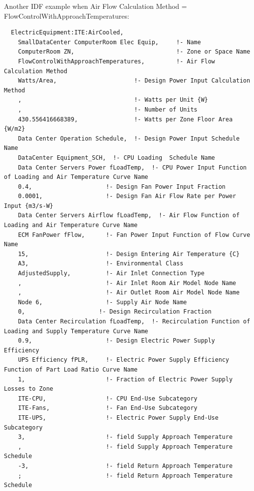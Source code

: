 Another IDF example when Air Flow Calculation Method = FlowControlWithApproachTemperatures:

\begin{lstlisting}
  ElectricEquipment:ITE:AirCooled,
    SmallDataCenter ComputerRoom Elec Equip,     !- Name
    ComputerRoom ZN,                             !- Zone or Space Name
    FlowControlWithApproachTemperatures,         !- Air Flow Calculation Method
    Watts/Area,                      !- Design Power Input Calculation Method
    ,                                !- Watts per Unit {W}
    ,                                !- Number of Units
    430.556416668389,                !- Watts per Zone Floor Area {W/m2}
    Data Center Operation Schedule,  !- Design Power Input Schedule Name
    DataCenter Equipment_SCH,  !- CPU Loading  Schedule Name
    Data Center Servers Power fLoadTemp,  !- CPU Power Input Function of Loading and Air Temperature Curve Name
    0.4,                     !- Design Fan Power Input Fraction
    0.0001,                  !- Design Fan Air Flow Rate per Power Input {m3/s-W}
    Data Center Servers Airflow fLoadTemp,  !- Air Flow Function of Loading and Air Temperature Curve Name
    ECM FanPower fFlow,      !- Fan Power Input Function of Flow Curve Name
    15,                      !- Design Entering Air Temperature {C}
    A3,                      !- Environmental Class
    AdjustedSupply,          !- Air Inlet Connection Type
    ,                        !- Air Inlet Room Air Model Node Name
    ,                        !- Air Outlet Room Air Model Node Name
    Node 6, 			     !- Supply Air Node Name
    0,                     !- Design Recirculation Fraction
    Data Center Recirculation fLoadTemp,  !- Recirculation Function of Loading and Supply Temperature Curve Name
    0.9,                     !- Design Electric Power Supply Efficiency
    UPS Efficiency fPLR,     !- Electric Power Supply Efficiency Function of Part Load Ratio Curve Name
    1,                       !- Fraction of Electric Power Supply Losses to Zone
    ITE-CPU,                 !- CPU End-Use Subcategory
    ITE-Fans,                !- Fan End-Use Subcategory
    ITE-UPS,                 !- Electric Power Supply End-Use Subcategory
    3,                       !- field Supply Approach Temperature
    ,                        !- field Supply Approach Temperature Schedule
    -3,                      !- field Return Approach Temperature
    ;                        !- field Return Approach Temperature Schedule
\end{lstlisting}

